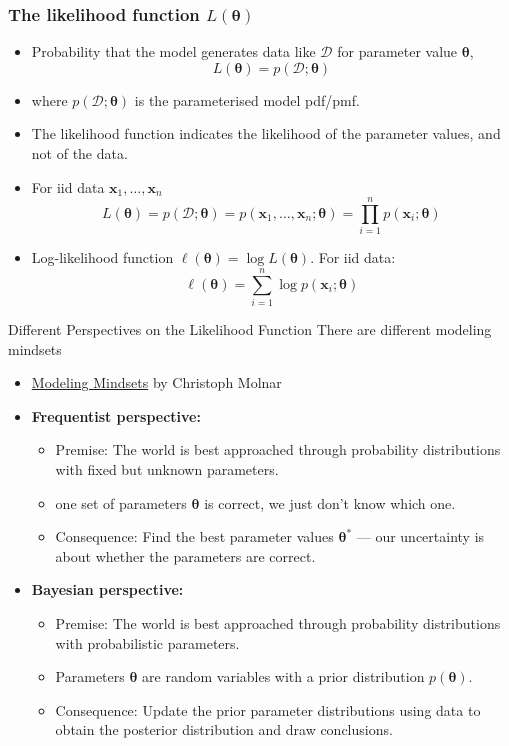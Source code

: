 \documentclass{beamer}
\begin{document}
\begin{frame}
  \frametitle{The likelihood function $L(\bm{\theta})$}

  \begin{itemize}
    \item Probability that the model generates data like $\mathcal{D}$ for parameter value $\bm{\theta}$,
    \[
      L(\bm{\theta}) = p(\mathcal{D}; \bm{\theta})
    \]
    \item[] where $p(\mathcal{D}; \bm{\theta})$ is the parameterised model pdf/pmf.
    \item The likelihood function indicates the likelihood of the parameter values, and not of the data.
    \item For iid data $\bm{x}_1, \dots, \bm{x}_n$
    \[
      L(\bm{\theta}) = p(\mathcal{D}; \bm{\theta}) = p(\bm{x}_1, \dots, \bm{x}_n; \bm{\theta}) = \prod_{i=1}^n p(\bm{x}_i; \bm{\theta})
    \]
    \item Log-likelihood function $\ell(\bm{\theta}) = \log L(\bm{\theta})$. For iid data:
    \[
      \ell(\bm{\theta}) = \sum_{i=1}^n \log p(\bm{x}_i; \bm{\theta})
    \]
  \end{itemize}
\end{frame}

\begin{frame}{Different Perspectives on the Likelihood Function}
 There are different modeling mindsets
  \begin{itemize}
  \item \href{https://christophmolnar.com/books/modeling-mindsets}{Modeling Mindsets} by Christoph Molnar
  \end{itemize}
  \vspace{0.5cm}
  \begin{itemize}
  \item \textbf{Frequentist perspective:}
    \begin{itemize}
    \item Premise: The world is best approached through probability distributions with fixed but unknown parameters.
    \item one set of parameters $\bm{\theta}$ is correct, we just don’t know which one.
    \item Consequence: Find the best parameter values $\bm{\theta}^*$ --- our uncertainty is about whether the parameters are correct.

    \end{itemize}
  \item \textbf{Bayesian perspective:}
    \begin{itemize}
    \item Premise: The world is best approached through probability distributions with probabilistic parameters.
    \item Parameters $\bm{\theta}$ are random variables with a prior distribution $p(\bm{\theta})$.
    \item Consequence: Update the prior parameter distributions using data to obtain the posterior distribution and draw conclusions.
    \end{itemize}
    \end{itemize}
\end{frame}
\end{document}
